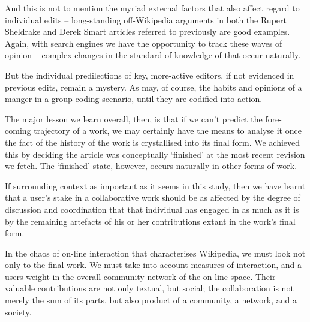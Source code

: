And this is not to mention the myriad external factors that also
affect regard to individual edits -- long-standing off-Wikipedia
arguments in both the Rupert Sheldrake and Derek Smart articles
referred to previously are good examples. Again, with search engines
we have the opportunity to track these waves of opinion -- complex
changes in the standard of knowledge of that occur naturally.

But the individual predilections of key, more-active editors, if not
evidenced in previous edits, remain a mystery. As may, of course, the
habits and opinions of a manger in a group-coding scenario, until
they are codified into action.

The major lesson we learn overall, then, is that if we can't predict
the fore-coming trajectory of a work, we may certainly have the means
to analyse it once the fact of the history of the work is crystallised
into its final form. We achieved this by deciding the article was
conceptually `finished' at the most recent revision we fetch. The
`finished' state, however, occurs naturally in other forms of work.

If surrounding context as important as it seems in this study, then we
have learnt that a user's stake in a collaborative work should be as
affected by the degree of discussion and coordination that that
individual has engaged in as much as it is by the remaining artefacts
of his or her contributions extant in the work's final form.

In the chaos of on-line interaction that characterises Wikipedia, we
must look not only to the final work. We must take into account
measures of interaction, and a users weight in the overall community
network of the on-line space. Their valuable contributions are not
only textual, but social; the collaboration is not merely the sum of
its parts, but also product of a community, a network, and a society.





